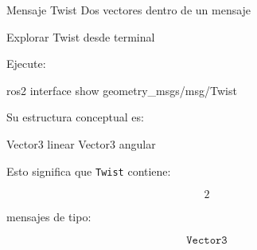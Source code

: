 \documentclass[aspectratio=169]{beamer}
\begin{document}
\SectionSlide
{Mensaje Twist}
{Dos vectores dentro de un mensaje}

\begin{frame}[fragile]{Explorar Twist desde terminal}

    Ejecute:

    \begin{bashcodedark}
        ros2 interface show geometry_msgs/msg/Twist
    \end{bashcodedark}

    Su estructura conceptual es:

    \begin{consolecodedark}
        Vector3 linear
        Vector3 angular
    \end{consolecodedark}

    \vspace{0.3cm}

    Esto significa que \texttt{Twist} contiene:

    \[
    2
    \]

    mensajes de tipo:

    \[
    \texttt{Vector3}
    \]

\end{frame}
\end{document}
